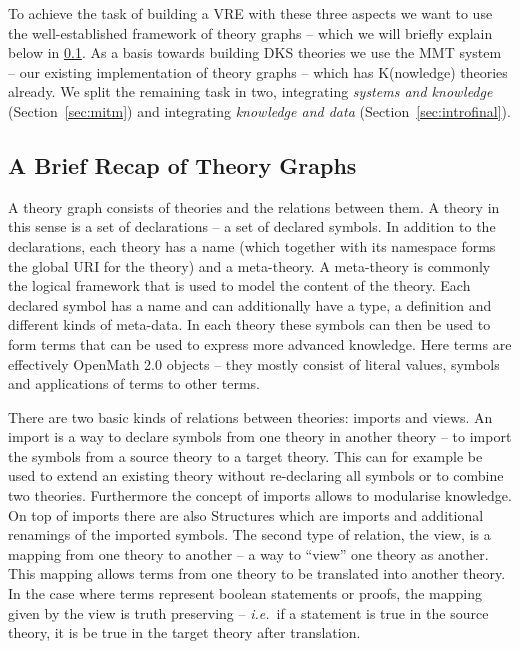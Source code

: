 \documentclass{deliverablereport}
\begin{document}
To achieve the task of building a VRE with these three aspects we want to use the well-established framework of theory graphs -- which we will briefly explain below in \ref{sec:mmt}. As a basis towards building DKS theories we use the MMT system -- our existing implementation of theory graphs -- which has K(nowledge) theories already. We split the remaining task in two, integrating \textit{systems and knowledge} (Section~\ref{sec:mitm}) and integrating \textit{knowledge and data} (Section~\ref{sec:introfinal}).

\subsection{A Brief Recap of Theory Graphs}\label{sec:mmt}

A theory graph consists of theories and the relations between them. A theory in this sense is a set of declarations -- a set of declared symbols. In addition to the declarations, each theory has a name (which together with its namespace forms the global URI for the theory) and a meta-theory. A meta-theory is commonly the logical framework that is used to model the content of the theory. Each declared symbol has a name and can additionally have a type, a definition and different kinds of meta-data. In each theory these symbols can then be used to form terms that can be used to express more advanced knowledge. Here terms are effectively OpenMath 2.0 \cite{BusCapCar:2oms04} objects -- they mostly consist of literal values, symbols and applications of terms to other terms.

There are two basic kinds of relations between theories: imports and views. An import is a way to declare symbols from one theory in another theory -- to import the symbols from a source theory to a target theory. This can for example be used to extend an existing theory without re-declaring all symbols or to combine two theories. Furthermore the concept of imports allows to modularise knowledge. On top of imports there are also Structures which are imports and additional renamings of the imported symbols. The second type of relation, the view, is a mapping from one theory to another -- a way to ``view'' one theory as another. This mapping allows terms from one theory to be translated into another theory. In the case where terms represent boolean statements or proofs, the mapping given by the view is truth preserving -- \emph{i.e.}~if a statement is true in the source theory, it is be true in the target theory after translation.
\end{document}
